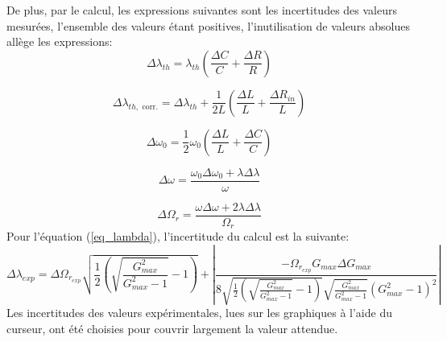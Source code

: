 \documentclass[a4paper, 12pt,oneside]{article}
\begin{document}
De plus, par le calcul, les expressions suivantes sont les incertitudes des valeurs mesurées, l'ensemble des valeurs étant positives, l'inutilisation de valeurs absolues allège les expressions:
\[
    \Delta \lambda_{th} = \lambda_{th} \left( \frac{\Delta C}{C} + \frac{\Delta R}{R} \right)
\]

\[
    \Delta \lambda_{th, \text{ corr.}} = \Delta \lambda_{th} + \frac{1}{2L} \left( \frac{\Delta L}{L} + \frac{\Delta R_{in}}{L} \right)
\]

\[
    \Delta \omega_0 = \frac{1}{2} \omega_0 \left( \frac{\Delta L}{L} + \frac{\Delta C}{C} \right)
\]

\[
    \Delta \omega = \frac{\omega_0 \Delta \omega_0 + \lambda \Delta \lambda}{\omega}
\]

\[
    \Delta \Omega_r = \frac{\omega \Delta \omega + 2 \lambda \Delta \lambda}{\Omega_r}
\]
Pour l'équation (\ref{eq_lambda}), l'incertitude du calcul est la suivante:
\[
    \Delta\lambda_{exp} = \Delta\Omega_{r_{exp}}\sqrt{\frac{1}{2}\left(\sqrt{\frac{G_{max}^2}{G_{max}^2-1}}-1\right)}+\left| \frac{-\Omega_{r_{exp}}G_{max}\Delta G_{max}}{8\sqrt{\frac{1}{2}\left(\sqrt{\frac{G_{max}^2}{G_{max}^2-1}}-1\right)}\sqrt{\frac{G_{max}^2}{G_{max}^2-1}}(G_{max}^2-1)^2} \right|
\]
Les incertitudes des valeurs expérimentales, lues sur les graphiques à l'aide du curseur, ont été choisies pour couvrir largement la valeur attendue.
\end{document}
